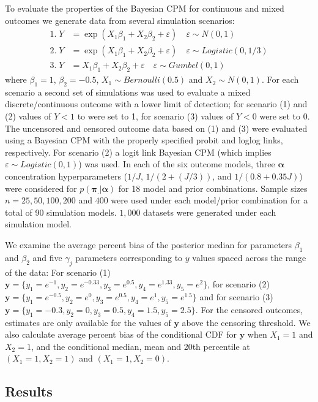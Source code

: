 \documentclass[
]{article}
\begin{document}
To evaluate the properties of the Bayesian CPM for continuous and mixed outcomes we generate data from several simulation scenarios:
\begin{align*}
1.\; Y&=\exp(X_1\beta_1 + X_2 \beta_2 + \varepsilon) \quad \varepsilon \sim N(0,1)\\
2.\; Y&=\exp(X_1\beta_1 + X_2 \beta_2 + \varepsilon) \quad \varepsilon \sim Logistic(0,1/3)\\
3.\; Y&=X_1\beta_1 + X_2 \beta_2 + \varepsilon \quad \varepsilon \sim Gumbel(0,1)
\end{align*}
where \(\beta_1=1\), \(\beta_2=-0.5\), \(X_1 \sim Bernoulli(0.5)\) and \(X_2 \sim N(0,1)\). For each scenario a second set of simulations was used to evaluate a mixed discrete/continuous outcome with a lower limit of detection; for scenario (1) and (2) values of \(Y<1\) to were set to 1, for scenario (3) values of \(Y<0\) were set to 0. The uncensored and censored outcome data based on (1) and (3) were evaluated using a Bayesian CPM with the properly specified probit and loglog links, respectively. For scenario (2) a logit link Bayesian CPM (which implies \(\varepsilon \sim Logistic(0,1)\)) was used. In each of the six outcome models, three \(\boldsymbol{\alpha}\) concentration hyperparameters (\(1/J\), \(1/(2+(J/3))\), and \(1/(0.8+0.35J)\)) were considered for \(p(\boldsymbol{\pi_{.}}|\boldsymbol{\alpha})\) for 18 model and prior combinations. Sample sizes \(n=25,50,100,200\) and \(400\) were used under each model/prior combination for a total of 90 simulation models. \(1,000\) datasets were generated under each simulation model.

We examine the average percent bias of the posterior median for parameters \(\beta_1\) and \(\beta_2\) and five \(\gamma_j\) parameters corresponding to \(y\) values spaced across the range of the data: For scenario (1) \(\boldsymbol{y}=\{y_1=e^{-1},y_2=e^{-0.33},y_3=e^{0.5},y_4=e^{1.33},y_5=e^2\}\), for scenario (2) \(\boldsymbol{y}=\{y_1=e^{-0.5},y_2=e^{0},y_3=e^{0.5},y_4=e^{1},y_5=e^{1.5}\}\) and for scenario (3) \(\boldsymbol{y}=\{y_1=-0.3,y_2=0,y_3=0.5,y_4=1.5,y_5=2.5\}\). For the censored outcomes, estimates are only available for the values of \(\boldsymbol{y}\) above the censoring threshold. We also calculate average percent bias of the conditional CDF for \(\boldsymbol{y}\) when \(X_1=1\) and \(X_2=1\), and the conditional median, mean and 20th percentile at \((X_1=1,X_2=1)\) and \((X_1=1,X_2=0)\).

\hypertarget{results}{%
\subsection{Results}\label{results}}
\end{document}
